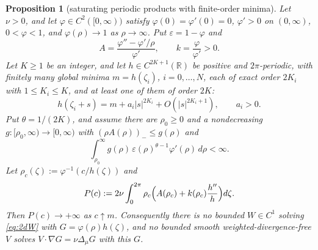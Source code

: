 \documentclass[11pt]{article}
\newtheorem{proposition}[theorem]{Proposition}
\theoremstyle{definition}
\newcommand{\R}{\mathbb{R}}
\begin{document}
\begin{proposition}[saturating periodic products with finite-order minima]\label{prop:periodicgen}
Let $\nu>0$, and let $\varphi\in C^2([0,\infty))$ satisfy
$\varphi(0)=\varphi'(0)=0$, $\varphi'>0$ on $(0,\infty)$, $0<\varphi<1$, and
$\varphi(\rho)\to1$ as $\rho\to\infty$. Put $\varepsilon=1-\varphi$ and
\begin{equation}
A=\frac{\varphi''-\varphi'/\rho}{\varphi'},\qquad k=\frac{\varphi}{\varphi'}>0 .
\end{equation}
Let $K\ge1$ be an integer, and let $h\in C^{2K+1}(\R)$ be positive and
$2\pi$-periodic, with finitely many global minima $m=h(\zeta_i)$,
$i=0,\dots,N$, each of exact order $2K_i$ with $1\le K_i\le K$, and at least
one of them of order $2K$:
\begin{equation}
h(\zeta_i+s)=m+a_i|s|^{2K_i}+O(|s|^{2K_i+1}),\qquad a_i>0 .
\end{equation}
Put $\theta=1/(2K)$, and assume there are $\rho_0\ge0$ and a nondecreasing
$g:[\rho_0,\infty)\to[0,\infty)$ with $(\rho A(\rho))_-\le g(\rho)$ and
\begin{equation}\label{eq:Htheta}
\int_{\rho_0}^{\infty}g(\rho)\,
\varepsilon(\rho)^{\theta-1}\varphi'(\rho)\,d\rho<\infty .
\end{equation}
Let $\rho_c(\zeta):=\varphi^{-1}(c/h(\zeta))$ and
\begin{equation}
P(c):=2\nu\int_0^{2\pi}\rho_c\Bigl(A(\rho_c)+k(\rho_c)\frac{h''}{h}\Bigr)d\zeta .
\end{equation}
Then $P(c)\to+\infty$ as $c\uparrow m$. Consequently there is no bounded
$W\in C^1$ solving \eqref{eq:2dW} with $G=\varphi(\rho)h(\zeta)$, and no
bounded smooth weighted-divergence-free $V$ solves
$V\cdot\nabla G=\nu\Delta_\mu G$ with this $G$.
\end{proposition}
\end{document}
